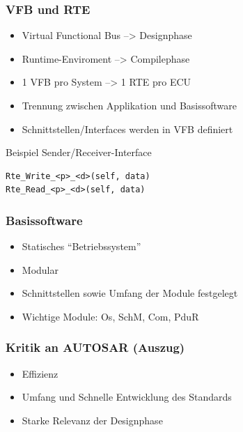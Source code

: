 \documentclass[]{beamer}
\begin{document}
\begin{frame}[fragile]
\frametitle{VFB und RTE}
    \begin{itemize}
        \item Virtual Functional Bus --> Designphase
        \item Runtime-Enviroment --> Compilephase
        \item 1 VFB pro System --> 1 RTE pro ECU
        \item Trennung zwischen Applikation und Basissoftware
        \item Schnittstellen/Interfaces werden in VFB definiert
    \end{itemize}
    \begin{exampleblock}{Beispiel Sender/Receiver-Interface}
        \begin{verbatim}
Rte_Write_<p>_<d>(self, data)
Rte_Read_<p>_<d>(self, data)
        \end{verbatim}
    \end{exampleblock}
\end{frame}


\begin{frame}
\frametitle{Basissoftware}
    \begin{itemize}
        \item Statisches "`Betriebssystem"'
        \item Modular
        \item Schnittstellen sowie Umfang der Module festgelegt
        \item Wichtige Module: Os, SchM, Com, PduR
    \end{itemize}
\end{frame}




\begin{frame}
\frametitle{Kritik an AUTOSAR (Auszug)}
    \begin{itemize}
        \item Effizienz
        \item Umfang und Schnelle Entwicklung des Standards
        \item Starke Relevanz der Designphase
    \end{itemize}
\end{frame}









\end{document}
